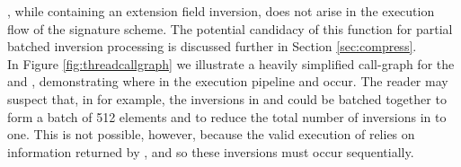 \noindent
{}, while containing an extension field inversion, does not arise in the execution flow of the signature scheme. The potential candidacy of this function for partial batched inversion processing is discussed further in Section \ref{sec:compress}.\\

In Figure \ref{fig:threadcallgraph} we illustrate a heavily simplified call-graph for the  and , demonstrating where in the execution pipeline  and  occur. The reader may suspect that, in  for example, the inversions in  and  could be batched together to form a batch of 512 elements and to reduce the total number of inversions in  to one. This is not possible, however, because the valid execution of  relies on information returned by , and so these inversions must occur sequentially. 

